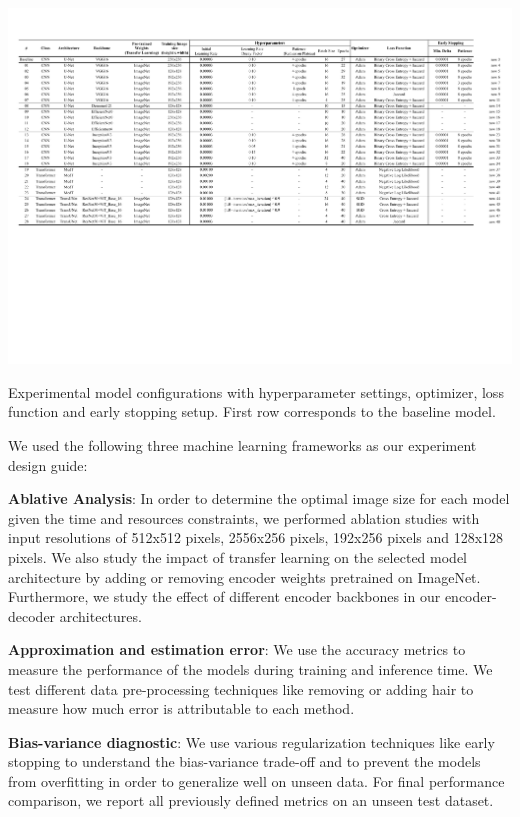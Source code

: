 \begin{table}[ht]
  \centering
  \includegraphics[width=\textwidth]{assets/experiments.pdf}
  \caption[Experiments]{Experimental model configurations with hyperparameter settings, optimizer, loss function and early stopping setup. First row corresponds to the baseline model.}
  \label{table:experiments}
\end{table}

We used the following three machine learning frameworks as our experiment design guide:

\textbf{Ablative Analysis}: In order to determine the optimal image size for each model given the time and resources constraints, we performed ablation studies with input resolutions of 512x512 pixels, 2556x256 pixels, 192x256 pixels and 128x128 pixels. We also study the impact of transfer learning on the selected model architecture by adding or removing encoder weights pretrained on ImageNet. Furthermore, we study the effect of different encoder backbones in our encoder-decoder architectures.

\textbf{Approximation and estimation error}: We use the accuracy metrics to measure the performance of the models during training and inference time. We test different data pre-processing techniques like removing or adding hair to measure how much error is attributable to each method.

\textbf{Bias-variance diagnostic}: We use various regularization techniques like early stopping to understand the bias-variance trade-off and to prevent the models from overfitting in order to generalize well on unseen data. For final performance comparison, we report all previously defined metrics on an unseen test dataset.



